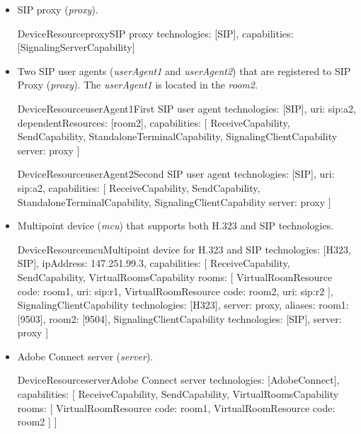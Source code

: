 \begin{itemize}
\item SIP proxy (\emph{proxy}).

\begin{EntityExample}{DeviceResource}{proxy}{SIP proxy}
technologies: [SIP], 
capabilities: [SignalingServerCapability]
\end{EntityExample}

\item Two SIP user agents (\emph{userAgent1} and \emph{userAgent2}) that are
  registered to SIP Proxy (\emph{proxy}). The \emph{userAgent1} is located in
  the \emph{room2}.
  
\begin{EntityExample}{DeviceResource}{userAgent1}{First SIP user agent}
technologies: [SIP],
uri: sip:a2,
dependentResources: [room2],
capabilities: [
  ReceiveCapability, SendCapability,
  StandaloneTerminalCapability,
  SignalingClientCapability {server: proxy}
]
\end{EntityExample}

\begin{EntityExample}{DeviceResource}{userAgent2}{Second SIP user agent}
technologies: [SIP],
uri: sip:a2,
capabilities: [
  ReceiveCapability, SendCapability,
  StandaloneTerminalCapability,
  SignalingClientCapability {server: proxy}
]
\end{EntityExample}

\item Multipoint device (\emph{mcu}) that supports both H.323 and SIP 
  technologies.
  
\begin{EntityExample}{DeviceResource}{mcu}{Multipoint device for H.323 and SIP}
technologies: [H323, SIP], 
ipAddress: 147.251.99.3,
capabilities: [
  ReceiveCapability, SendCapability,
  VirtualRoomsCapability {rooms: [
    VirtualRoomResource {code: room1, uri: sip:r1},
    VirtualRoomResource {code: room2, uri: sip:r2}
  ]},
  SignalingClientCapability {technologies: [H323], server: proxy, 
     aliases: {room1: [9503], room2: [9504]}},
  SignalingClientCapability {technologies: [SIP], server: proxy}
]
\end{EntityExample}

\item Adobe Connect server (\emph{server}).

\begin{EntityExample}{DeviceResource}{server}{Adobe Connect server}
technologies: [AdobeConnect],
capabilities: [
  ReceiveCapability, SendCapability,
  VirtualRoomsCapability {rooms: [ 
    VirtualRoomResource {code: room1}, 
    VirtualRoomResource {code: room2}
  ]}
]
\end{EntityExample}


\end{itemize}
